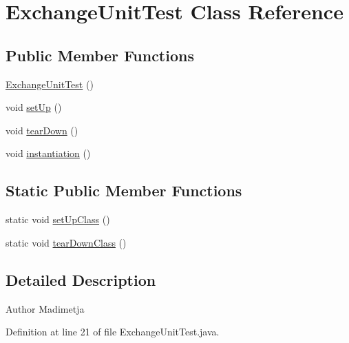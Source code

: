 \hypertarget{class_exchange_unit_test}{\section{Exchange\+Unit\+Test Class Reference}
\label{class_exchange_unit_test}
}
\subsection*{Public Member Functions}
\begin{DoxyCompactItemize}
\item 
\hyperlink{class_exchange_unit_test_a5d935cc130f600879e820fe1b7cb1af6}{Exchange\+Unit\+Test} ()
\item 
void \hyperlink{class_exchange_unit_test_a61dd0af902dc0da5513c53a2dc797b33}{set\+Up} ()
\item 
void \hyperlink{class_exchange_unit_test_a58164607cebb6763d2c7ab8866988cfb}{tear\+Down} ()
\item 
void \hyperlink{class_exchange_unit_test_a7196c89003b25fcbe16ce03c95ad3cb6}{instantiation} ()
\end{DoxyCompactItemize}
\subsection*{Static Public Member Functions}
\begin{DoxyCompactItemize}
\item 
static void \hyperlink{class_exchange_unit_test_abaa84464701e883f0938e6fdbe2b72b5}{set\+Up\+Class} ()
\item 
static void \hyperlink{class_exchange_unit_test_aeb8675a172645bd95fe665ad75f92bd5}{tear\+Down\+Class} ()
\end{DoxyCompactItemize}


\subsection{Detailed Description}
\begin{DoxyAuthor}{Author}
Madimetja 
\end{DoxyAuthor}


Definition at line 21 of file Exchange\+Unit\+Test.\+java.



